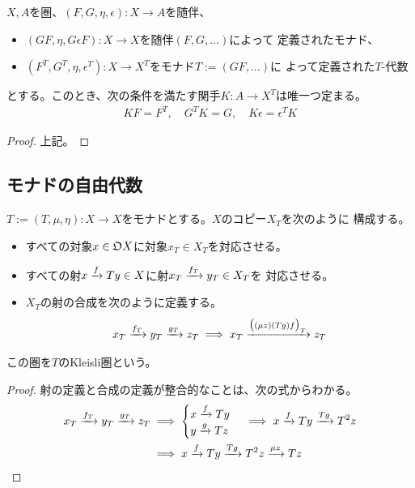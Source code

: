 {	\begin{proposition}[随伴と代数の比較]\label{prop:随伴と代数の比較} %
		$X,A$を圏、$(F,G,\eta,\epsilon):X\to A$を随伴、
		\begin{itemize}\setlength{\itemsep}{-1mm} %
			\item $(GF,\eta,G\epsilon F):X\to X$を随伴$(F,G,\dots)$によって
			定義されたモナド、
			\item $(F^T,G^T,\eta,\epsilon^T):X\to X^T$をモナド$T:=(GF,\dots)$に
			よって定義された$T$-代数
		\end{itemize} %
		とする。このとき、次の条件を満たす関手$K:A\to X^T$は唯一つ定まる。
		\begin{equation*}\begin{split}
			KF = F^T ,\quad G^TK = G ,\quad K\epsilon = \epsilon^TK
		\end{split}\end{equation*}
	\end{proposition} %
	\begin{proof} %
		上記。
	\end{proof} %
\subsection{モナドの自由代数}\label{s2:モナドの自由代数} %
	\begin{definition}[Kleisli圏]\label{def:Kleisli圏} %
		$T:=(T,\mu,\eta):X\to X$をモナドとする。$X$のコピー$X_T$を次のように
		構成する。
		\begin{itemize}\setlength{\itemsep}{-1mm} %
			\item すべての対象$x\in{\mathfrak{O}} X$に対象$x_T\in X_T$を対応させる。
			\item すべての射$x\xrightarrow[{}]{f}Ty\in X$に射$x_T\xrightarrow[{}]{f_T}y_T\in X_T$を
			対応させる。
			\item $X_T$の射の合成を次のように定義する。
			\begin{equation*}\begin{split}
				x_T\xrightarrow[{}]{f_T}y_T\xrightarrow[{}]{g_T}z_T \implies 
				x_T\xrightarrow[{}]{\mathinner{\bigl({(\mu z)(Tg)f}\bigr)}_T}z_T
			\end{split}\end{equation*}
		\end{itemize} %
		この圏を$T$のKleisli圏という。\EOP
	\end{definition} %
	\begin{proof} %
		射の定義と合成の定義が整合的なことは、次の式からわかる。
		\begin{equation*}\begin{split}
			x_T\xrightarrow[{}]{f_T}y_T\xrightarrow[{}]{g_T}z_T &\implies \begin{cases}
				x\xrightarrow[{}]{f}Ty \\
				y\xrightarrow[{}]{g}Tz
			\end{cases} \implies x\xrightarrow[{}]{f}Ty\xrightarrow[{}]{Tg}T^2z \\
			&\implies x\xrightarrow[{}]{f}Ty\xrightarrow[{}]{Tg}T^2z\xrightarrow[{}]{\mu z}Tz
		\end{split}\end{equation*}
	\end{proof} %

}
